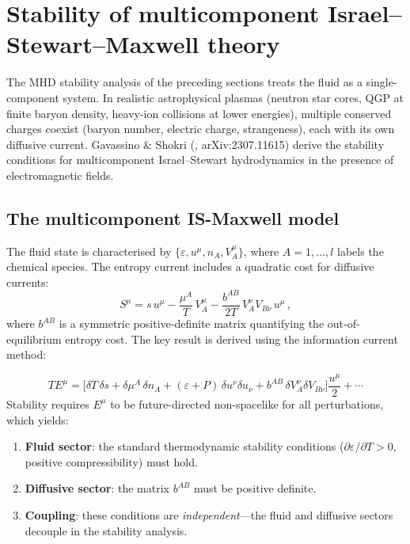 \section{Stability of multicomponent Israel--Stewart--Maxwell theory}
\label{sec:rel-9-multicomponent-IS}

The MHD stability analysis of the preceding sections treats the fluid
as a single-component system.  In realistic astrophysical plasmas (neutron
star cores, QGP at finite baryon density, heavy-ion collisions at lower
energies), multiple conserved charges coexist (baryon number, electric
charge, strangeness), each with its own diffusive current.
Gavassino \& Shokri (\citealt{GavassinoShokri2024}, arXiv:2307.11615)
derive the stability conditions for multicomponent Israel--Stewart
hydrodynamics in the presence of electromagnetic fields.

\subsection{The multicomponent IS-Maxwell model}

The fluid state is characterised by $\{\varepsilon, u^\mu, n_A,
V_A^\mu\}$, where $A = 1,\ldots,l$ labels the chemical species.
The entropy current includes a quadratic cost for diffusive currents:
\begin{equation}
\label{eq:rel-9-IS-entropy}
S^\mu = s\,u^\mu - \frac{\mu^A}{T}\,V_A^\mu
  - \frac{b^{AB}}{2T}\,V_A^\nu V_{B\nu}\,u^\mu\,,
\end{equation}
where $b^{AB}$ is a symmetric positive-definite matrix quantifying the
out-of-equilibrium entropy cost.  The key result is derived using the
information current method:

\begin{equation}
\label{eq:rel-9-IS-info-current}
T E^\mu = \biggl[\delta T\,\delta s + \delta\mu^A\,\delta n_A
  + (\varepsilon{+}P)\,\delta u^\nu\delta u_\nu
  + b^{AB}\,\delta V_A^\nu\delta V_{B\nu}\biggr]
  \frac{u^\mu}{2} + \cdots
\end{equation}
Stability requires $E^\mu$ to be future-directed non-spacelike for all
perturbations, which yields:
\begin{enumerate}
\item \textbf{Fluid sector}: the standard thermodynamic stability
  conditions ($\partial\varepsilon/\partial T > 0$, positive
  compressibility) must hold.
\item \textbf{Diffusive sector}: the matrix $b^{AB}$ must be positive
  definite.
\item \textbf{Coupling}: these conditions are \emph{independent}---the
  fluid and diffusive sectors decouple in the stability analysis.
\end{enumerate}

